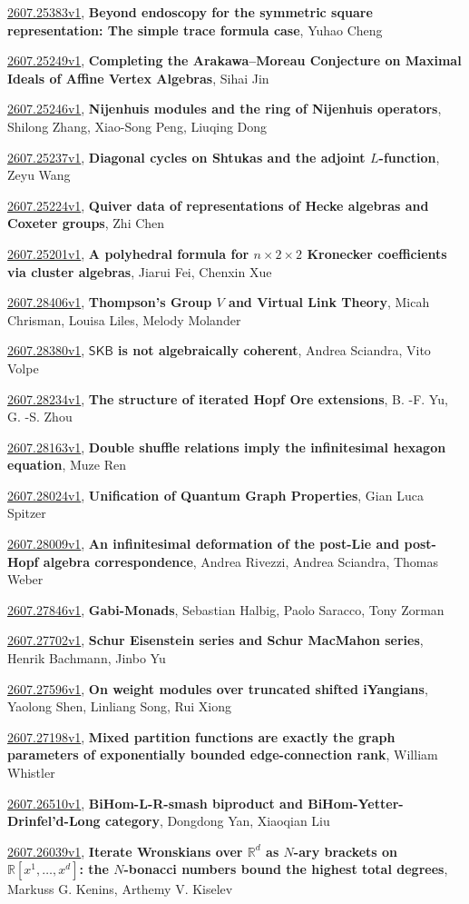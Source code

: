 \documentclass[9pt, a4paper]{article}
\theoremstyle{plain}
\theoremstyle{definition}
\theoremstyle{remark}
\newcommand{\arxiv}[3]{\href{https://arxiv.org/abs/#1}{#1}, \textbf{\textcolor{arxivblue}{#2}}, #3}
\begin{document}
\arxiv{2607.25383v1}{Beyond endoscopy for the symmetric square representation: The simple trace formula case}{Yuhao Cheng}

\arxiv{2607.25249v1}{Completing the Arakawa--Moreau Conjecture on Maximal Ideals of Affine Vertex Algebras}{Sihai Jin}

\arxiv{2607.25246v1}{Nijenhuis modules and the ring of Nijenhuis operators}{Shilong Zhang, Xiao-Song Peng, Liuqing Dong}

\arxiv{2607.25237v1}{Diagonal cycles on Shtukas and the adjoint $L$-function}{Zeyu Wang}

\arxiv{2607.25224v1}{Quiver data of representations of Hecke algebras and Coxeter groups}{Zhi Chen}

\arxiv{2607.25201v1}{A polyhedral formula for $n\times2\times2$ Kronecker coefficients via cluster algebras}{Jiarui Fei, Chenxin Xue}

\arxiv{2607.28406v1}{Thompson's Group $V$ and Virtual Link Theory}{Micah Chrisman, Louisa Liles, Melody Molander}

\arxiv{2607.28380v1}{$\mathsf{SKB}$ is not algebraically coherent}{Andrea Sciandra, Vito Volpe}

\arxiv{2607.28234v1}{The structure of iterated Hopf Ore extensions}{B. -F. Yu, G. -S. Zhou}

\arxiv{2607.28163v1}{Double shuffle relations imply the infinitesimal hexagon equation}{Muze Ren}

\arxiv{2607.28024v1}{Unification of Quantum Graph Properties}{Gian Luca Spitzer}

\arxiv{2607.28009v1}{An infinitesimal deformation of the post-Lie and post-Hopf algebra correspondence}{Andrea Rivezzi, Andrea Sciandra, Thomas Weber}

\arxiv{2607.27846v1}{Gabi-Monads}{Sebastian Halbig, Paolo Saracco, Tony Zorman}

\arxiv{2607.27702v1}{Schur Eisenstein series and Schur MacMahon series}{Henrik Bachmann, Jinbo Yu}

\arxiv{2607.27596v1}{On weight modules over truncated shifted iYangians}{Yaolong Shen, Linliang Song, Rui Xiong}

\arxiv{2607.27198v1}{Mixed partition functions are exactly the graph parameters of exponentially bounded edge-connection rank}{William Whistler}

\arxiv{2607.26510v1}{BiHom-L-R-smash biproduct and BiHom-Yetter-Drinfel'd-Long category}{Dongdong Yan, Xiaoqian Liu}

\arxiv{2607.26039v1}{Iterate Wronskians over $\mathbb{R}^d$ as $N$-ary brackets on $\mathbb{R}[x^1,\ldots,x^d]$: the $N$-bonacci numbers bound the highest total degrees}{Markuss G. Kenins, Arthemy V. Kiselev}
\end{document}
